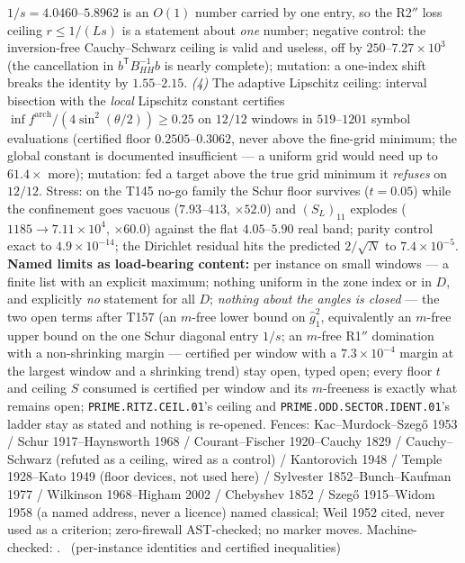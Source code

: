 $1/s=4.0460$--$5.8962$ is an $O(1)$ number carried by one entry, so the
R2$''$ loss ceiling $r\le1/(Ls)$ is a statement about \emph{one} number;
negative control: the inversion-free Cauchy--Schwarz ceiling is valid
and useless, off by $250$--$7.27\times10^{3}$ (the cancellation in
$b^{\mathsf T}B_{HH}^{-1}b$ is nearly complete); mutation: a one-index
shift breaks the identity by $1.55$--$2.15$. \emph{(4)} The adaptive
Lipschitz ceiling: interval bisection with the \emph{local} Lipschitz
constant certifies $\inf f^{\mathrm{arch}}/(4\sin^2(\theta/2))\ge0.25$
on $12/12$ windows in $519$--$1201$ symbol evaluations (certified floor
$0.2505$--$0.3062$, never above the fine-grid minimum; the global
constant is documented insufficient --- a uniform grid would need up to
$61.4\times$ more); mutation: fed a target above the true grid minimum
it \emph{refuses} on $12/12$. Stress: on the T145 no-go family the Schur
floor survives ($t=0.05$) while the confinement goes vacuous
($7.93$--$413$, $\times52.0$) and $(S_L)_{11}$ explodes
($1185\to7.11\times10^{4}$, $\times60.0$) against the flat
$4.05$--$5.90$ real band; parity control exact to $4.9\times10^{-14}$;
the Dirichlet residual hits the predicted $2/\sqrt N$ to
$7.4\times10^{-5}$.
\textbf{Named limits as load-bearing content:} per instance on small
windows --- a finite list with an explicit maximum; nothing uniform in
the zone index or in $D$, and explicitly \emph{no} statement for all
$D$; \emph{nothing about the angles is closed} --- the two open terms
after T157 (an $m$-free lower bound on $\hat g_1^2$, equivalently an
$m$-free upper bound on the one Schur diagonal entry $1/s$; an $m$-free
R1$''$ domination with a non-shrinking margin --- certified per window
with a $7.3\times10^{-4}$ margin at the largest window and a shrinking
trend) stay open, typed open; every floor $t$ and ceiling $S$ consumed
is certified per window and its $m$-freeness is exactly what remains
open; \texttt{PRIME.RITZ.CEIL.01}'s ceiling and
\texttt{PRIME.ODD.SECTOR.IDENT.01}'s ladder stay as stated and nothing
is re-opened. Fences: Kac--Murdock--Szeg\H{o} 1953 / Schur
1917--Haynsworth 1968 / Courant--Fischer 1920--Cauchy 1829 /
Cauchy--Schwarz (refuted as a ceiling, wired as a control) / Kantorovich
1948 / Temple 1928--Kato 1949 (floor devices, not used here) / Sylvester
1852--Bunch--Kaufman 1977 / Wilkinson 1968--Higham 2002 / Chebyshev 1852
/ Szeg\H{o} 1915--Widom 1958 (a named address, never a licence) named
classical; Weil 1952 cited, never used as a criterion; zero-firewall
AST-checked; no marker moves.
Machine-checked: .
\mE\ (per-instance identities and certified inequalities)


